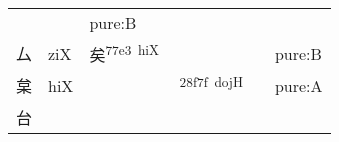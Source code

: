 \documentclass[14pt,a4paper]{scrartcl}
\begin{document}
\begin{longtable}[c]{@{}llllll@{}}
\begin{minipage}[t]{0.14\columnwidth}
\strut\end{minipage} &
\begin{minipage}[t]{0.14\columnwidth}\raggedright\strut
\strut\end{minipage} &
\begin{minipage}[t]{0.14\columnwidth}\raggedright\strut
pure:B
\strut\end{minipage}\tabularnewline
\begin{minipage}[t]{0.14\columnwidth}\raggedright\strut
厶
\strut\end{minipage} &
\begin{minipage}[t]{0.14\columnwidth}\raggedright\strut
ziX
\strut\end{minipage} &
\begin{minipage}[t]{0.14\columnwidth}\raggedright\strut
矣\textsuperscript{77e3~hiX}
\strut\end{minipage} &
\begin{minipage}[t]{0.14\columnwidth}\raggedright\strut
\strut\end{minipage} &
\begin{minipage}[t]{0.14\columnwidth}\raggedright\strut
\strut\end{minipage} &
\begin{minipage}[t]{0.14\columnwidth}\raggedright\strut
pure:B
\strut\end{minipage}\tabularnewline
\begin{minipage}[t]{0.14\columnwidth}\raggedright\strut
枲
\strut\end{minipage} &
\begin{minipage}[t]{0.14\columnwidth}\raggedright\strut
hiX
\strut\end{minipage} &
\begin{minipage}[t]{0.14\columnwidth}\raggedright\strut
\strut\end{minipage} &
\begin{minipage}[t]{0.14\columnwidth}\raggedright\strut
𨽿\textsuperscript{28f7f~dojH}
\strut\end{minipage} &
\begin{minipage}[t]{0.14\columnwidth}\raggedright\strut
\strut\end{minipage} &
\begin{minipage}[t]{0.14\columnwidth}\raggedright\strut
pure:A
\strut\end{minipage}\tabularnewline
\begin{minipage}[t]{0.14\columnwidth}\raggedright\strut
台
\strut\end{minipage} &
\begin{minipage}[t]{0.14\columnwidth}\raggedright\strut

\end{minipage}
\end{longtable}
\end{document}

